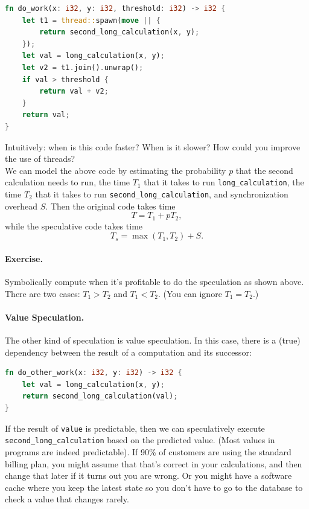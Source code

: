 \documentclass[a4paper]{report}
\begin{document}
\begin{lstlisting}[language=Rust]
fn do_work(x: i32, y: i32, threshold: i32) -> i32 {
    let t1 = thread::spawn(move || {
        return second_long_calculation(x, y);
    });
    let val = long_calculation(x, y);
    let v2 = t1.join().unwrap();
    if val > threshold {
        return val + v2;
    }
    return val;
}
\end{lstlisting}

{\sf Intuitively: when is this code faster? When is it slower? How
  could you improve the use of threads?}\\[4em]

We can model the above code by estimating the probability $p$ that
the second calculation needs to run, the time $T_1$ that it takes
to run {\tt long\_calculation}, the time $T_2$ that it takes to run
{\tt second\_long\_calculation}, and synchronization overhead $S$.
Then the original code takes time
\[ T = T_1 + p T_2, \]
while the speculative code takes time
\[ T_s = \max(T_1, T_2) + S.\]

\paragraph{Exercise.} Symbolically compute when it's profitable to do the
speculation as shown above. There are two cases: $T_1 > T_2$ and $T_1
< T_2$. (You can ignore $T_1 = T_2$.)


\paragraph{Value Speculation.}
The other kind of speculation is value speculation. In this case,
there is a (true) dependency between the result of a computation 
and its successor:

\begin{lstlisting}[language=Rust]
fn do_other_work(x: i32, y: i32) -> i32 {
    let val = long_calculation(x, y);
    return second_long_calculation(val);
}
\end{lstlisting}

If the result of {\tt value} is predictable, then we can speculatively
execute {\tt second\_long\_calculation} based on the predicted value.
(Most values in programs are indeed predictable). If 90\% of customers are using the standard billing plan, you might assume that that's correct in your calculations, and then change that later if it turns out you are wrong. Or you might have a software cache where you keep the latest state so you don't have to go to the database to check a value that changes rarely. 
\end{document}
